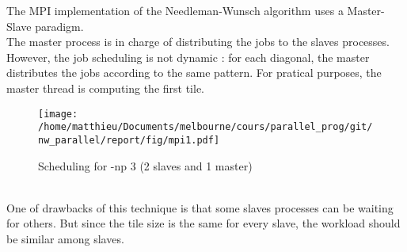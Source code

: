 The MPI implementation of the Needleman-Wunsch algorithm uses a Master-Slave paradigm. \\
The master process is in charge of distributing the jobs to the slaves processes. However, the job scheduling is not dynamic : for each diagonal, the master distributes the jobs according to the same pattern. For pratical purposes, the master thread is computing the first tile.
\begin{figure}[htp]
\centering
\texttt{[image: /home/matthieu/Documents/melbourne/cours/parallel\_prog/git/nw\_parallel/report/fig/mpi1.pdf]}
\caption{Scheduling for -np 3 (2 slaves and 1 master)}
\label{}
\end{figure}
\\
One of drawbacks of this technique is that some slaves processes can be waiting for others. But since the tile size is the same for every slave, the workload should be similar among slaves. \\
